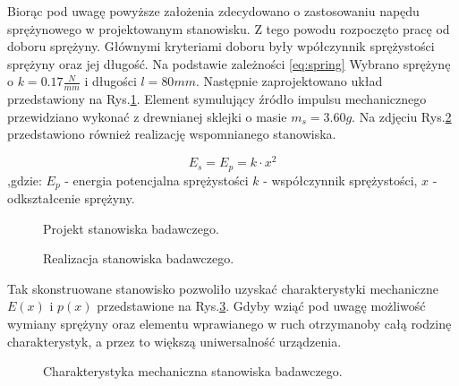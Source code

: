 \indent %
Biorąc pod uwagę powyższe założenia zdecydowano o zastosowaniu napędu sprężynowego w projektowanym stanowisku. Z tego powodu rozpoczęto pracę od doboru sprężyny. Głównymi kryteriami doboru były wpółczynnik sprężystości sprężyny oraz jej długość. Na podstawie zależności \ref{eq:spring} Wybrano sprężynę o $k=0.17\frac{N}{mm}$ i długości $l=80mm$. Następnie zaprojektowano
układ przedstawiony na Rys.\ref{fig:test_stand}. Element symulujący źródło impulsu mechanicznego przewidziano wykonać z drewnianej sklejki o masie $m_s = 3.60g$. Na zdjęciu Rys.\ref{fig:test_stand_photo} przedstawiono również realizację wspomnianego stanowiska.

\begin{equation}
E_s = E_p = k \cdot x^2
\label{eq:spring}
\end{equation}
,gdzie: $E_p$ - energia potencjalna sprężystości $k$ - współczynnik sprężystości, $x$ - odkształcenie sprężyny.


\begin{figure}[htbp]
\centering
{}%
\caption{Projekt stanowiska badawczego.}
\label{fig:test_stand}
\end{figure}

\begin{figure}[htbp]
\centering
{}
\caption{Realizacja stanowiska badawczego.}
\label{fig:test_stand_photo}
\end{figure}

Tak skonstruowane stanowisko pozwoliło uzyskać charakterystyki mechaniczne $E(x)$ i $p(x)$ przedstawione na Rys.\ref{fig:mech_char}. Gdyby wziąć pod uwagę możliwość wymiany sprężyny oraz elementu wprawianego w ruch otrzymanoby całą rodzinę charakterystyk, a przez to większą uniwersalność urządzenia.

\begin{figure}[htbp]
\centering
{}%
\caption{Charakterystyka mechaniczna stanowiska badawczego.}
\label{fig:mech_char}
\end{figure}


